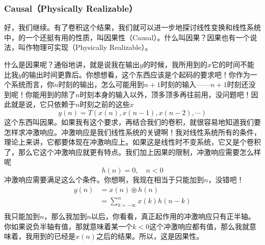 \documentclass[a4paper,12pt]{article}
\begin{document}
\subsubsection{Causal（Physically Realizable）}\quad

好，我们继续。有了卷积这个结果，我们就可以进一步地探讨线性变换和线性系统中，的一个还挺有用的性质，叫因果性（Causal）。什么叫因果？因果也有一个说法，叫作物理可实现（Physically Realizable）。

什么是因果呢？通俗地讲，就是说我在输出$y$的时候，我所用到的$x$它的时间不能比我$y$的输出时间更靠后。你想想看，这个东西应该是个起码的要求吧！你作为一个系统而言，你$n$时刻的输出，怎么可能用到$n+1$时刻的输入——$n+1$时刻还没到呢！你能用到的除了$n$时刻本身的输入以外，顶多顶多再往前用，没问题吧！因此就是说，它只依赖于$n$时刻之前的这些$x$
\begin{equation}
   y(n) = T\left ( x(n),x(n-1),x(n-2),\cdots \right )
\end{equation}
这个东西叫因果。如果我有这个要求，再结合我们的卷积，就很容易地知道我们要怎样求冲激响应。冲激响应是我们线性系统的关键啊！我对线性系统所有的条件，理论上来讲，它都要体现在冲激响应上。如果这是线性时不变系统，它又是个卷积了，那么它这个冲激响应就更有特点。我们加上因果的限制，冲激响应需要怎么样呢
\begin{equation}
   h(n) = 0,\quad n < 0
\end{equation}
冲激响应需要满足这么个条件。你想啊，我现在相当于只能加到$n$，没错吧！
\begin{equation}
\begin{aligned}
   y(n) &= x(n)\circledast h(n)\\
&= \sum_{k=-\infty}^{n}x(k)h(n-k)\\
\end{aligned}
\end{equation}
我只能加到$n$，那么我加到$n$以后，你看看，真正起作用的冲激响应只有正半轴。你如果说负半轴有值，那就意味着某一个$k<0$这个冲激响应都有值，那么我就意味着，我用到的已经是$x(n)$之后的结果。所以，这是因果性。
\end{document}
